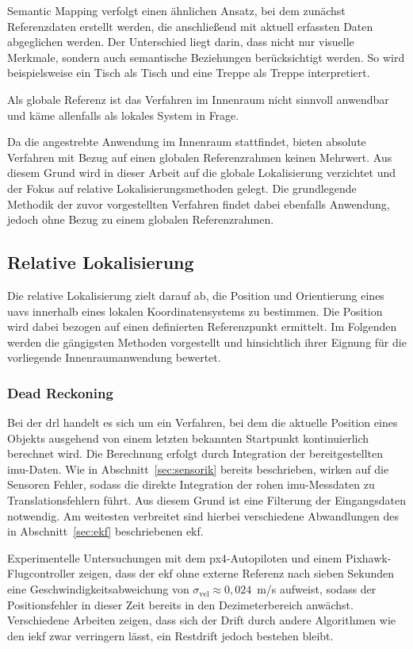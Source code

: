 Semantic Mapping verfolgt einen ähnlichen Ansatz, bei dem zunächst Referenzdaten erstellt werden, die anschließend mit aktuell erfassten Daten abgeglichen werden.
Der Unterschied liegt darin, dass nicht nur visuelle Merkmale, sondern auch semantische Beziehungen berücksichtigt werden.
So wird beispielsweise ein Tisch als Tisch und eine Treppe als Treppe interpretiert.~\cite{Jarraya2025}

Als globale Referenz ist das Verfahren im Innenraum nicht sinnvoll anwendbar und käme allenfalls als lokales System in Frage.

Da die angestrebte Anwendung im Innenraum stattfindet, bieten absolute Verfahren mit Bezug auf einen globalen Referenzrahmen keinen Mehrwert.
Aus diesem Grund wird in dieser Arbeit auf die globale Lokalisierung verzichtet und der Fokus auf relative Lokalisierungsmethoden gelegt.
Die grundlegende Methodik der zuvor vorgestellten Verfahren findet dabei ebenfalls Anwendung, jedoch ohne Bezug zu einem globalen Referenzrahmen.

\subsection{Relative Lokalisierung}
\label{sec:relative_lokalisierung}
Die relative Lokalisierung zielt darauf ab, die Position und Orientierung eines \gls{uav}s innerhalb eines lokalen Koordinatensystems zu bestimmen.
Die Position wird dabei bezogen auf einen definierten Referenzpunkt ermittelt.
Im Folgenden werden die gängigsten Methoden vorgestellt und hinsichtlich ihrer Eignung für die vorliegende Innenraumanwendung bewertet.

\subsubsection*{Dead Reckoning}
Bei der \gls{drl} handelt es sich um ein Verfahren, bei dem die aktuelle Position eines 
Objekts ausgehend von einem letzten bekannten Startpunkt kontinuierlich berechnet 
wird.
Die Berechnung erfolgt durch Integration der bereitgestellten \gls{imu}-Daten.
Wie in Abschnitt~\ref{sec:sensorik} bereits beschrieben, wirken auf die Sensoren 
Fehler, sodass die direkte Integration der rohen \gls{imu}-Messdaten zu 
Translationsfehlern führt.
Aus diesem Grund ist eine Filterung der Eingangsdaten notwendig.
Am weitesten verbreitet sind hierbei verschiedene Abwandlungen des in Abschnitt~\ref{sec:ekf} beschriebenen \gls{ekf}.~\cite{9982087}

Experimentelle Untersuchungen mit dem \gls{px4}-Autopiloten und einem
Pixhawk-Flugcontroller zeigen, dass der \gls{ekf} ohne externe Referenz nach sieben Sekunden eine
Geschwindigkeitsabweichung von $\sigma_{\text{vel}} \approx 0{,}024$~m/s aufweist,
sodass der Positionsfehler in dieser Zeit bereits in den Dezimeterbereich anwächst.
Verschiedene Arbeiten zeigen, dass sich der Drift durch andere Algorithmen wie den \gls{iekf} zwar verringern lässt, 
ein Restdrift jedoch bestehen bleibt.~\cite{9982087,9172736,Ko2018}

